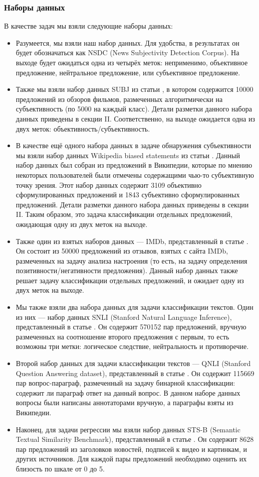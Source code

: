 \documentclass[conference]{IEEEtran}
\begin{document}
\subsubsection{Наборы данных}
В качестве задач мы взяли следующие наборы данных:
\begin{itemize}
    \item Разумеется, мы взяли наш набор данных. Для удобства, в результатах он будет обозначаться как NSDC (News Subjectivity Detection Corpus). На выходе будет ожидаться одна из четырёх меток: неприменимо, объективное предложение, нейтральное предложение, или субъективное предложение.
    \item Также мы взяли набор данных SUBJ из статьи \cite{subj}, в котором содержится 10000 предложений из обзоров фильмов, размеченных алгоритмически на субъективность (по 5000 на каждый класс). Детали разметки данного набора данных приведены в секции II. Соответственно, на выходе ожидается одна из двух меток: объективность/субъективность.
    \item В качестве ещё одного набора данных в задаче обнаружения субъективности мы взяли набор данных Wikipedia biased statements из статьи \cite{wikipedia-biased-statements}. Данный набор данных был собран из предложений в Википедии, которые по мнению некоторых пользователей были отмечены содержащими чью-то субъективную точку зрения. Этот набор данных содержит 3109 объективно сформулированных предложений и 1843 субъективно сформулированных предложений. Детали разметки данного набора данных приведены в секции II. Таким образом, это задача классификации отдельных предложений, ожидающая одну из двух меток на выходе.
    \item Также один из взятых наборов данных --- IMDb, представленный в статье \cite{imdb}. Он состоит из 50000 предложений из отзывов, взятых с сайта IMDb, размеченных на задачу анализа настроения (то есть, на задачу определения позитивности/негативности предложения). Данный набор данных также решает задачу классификации отдельных предложений, и ожидает одну из двух меток на выходе.
    \item Мы также взяли два набора данных для задачи классификации текстов. Один из них --- набор данных SNLI (Stanford Natural Language Inference), представленный в статье \cite{snli}. Он содержит 570152 пар предложений, вручную размеченных на соотношение второго предложения с первым, то есть возможны три метки: логическое следствие, нейтральность и противоречие.
    \item Второй набор данных для задачи классификации текстов --- QNLI (Stanford Question Answering dataset), представленный в статье \cite{qnli}. Он содержит 115669 пар вопрос-параграф, размеченный на задачу бинарной классификации: содержит ли параграф ответ на данный вопрос. В данном наборе данных вопросы были написаны аннотаторами вручную, а параграфы взяты из Википедии.
    \item Наконец, для задачи регрессии мы взяли набор данных STS-B (Semantic Textual Similarity Benchmark), представленный в статье \cite{sts-b}. Он содержит 8628 пар предложений из заголовков новостей, подписей к видео и картинкам, и других источников. Для каждой пары предложений необходимо оценить их близость по шкале от 0 до 5. 
\end{itemize}
\end{document}
